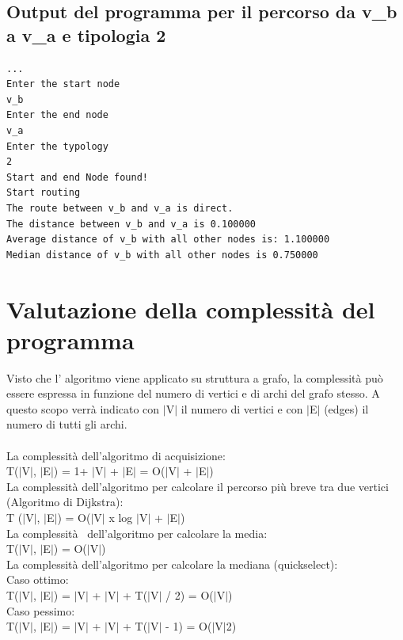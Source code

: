 \documentclass[11pt, a4paper, titlepage, block]{article}
\begin{document}
	\subsection{Output del programma per il percorso da v\_b a v\_a e tipologia 2}
	\begin{lstlisting}
...
Enter the start node
v_b
Enter the end node
v_a
Enter the typology
2
Start and end Node found!
Start routing
The route between v_b and v_a is direct.
The distance between v_b and v_a is 0.100000
Average distance of v_b with all other nodes is: 1.100000
Median distance of v_b with all other nodes is 0.750000
\end{lstlisting}
	
	\newpage
\section{Valutazione della complessit\`{a} del programma}
	Visto che l' algoritmo viene applicato su struttura a grafo, la complessit\`{a} pu\`{o} essere espressa in 
	funzione del numero di vertici e di archi del grafo stesso. A questo scopo verr\`{a} indicato con $|$V$|$ il 
	numero di vertici e con $|$E$|$ (edges) il numero di tutti gli archi.\\
	\\
	La complessit\`{a} dell'algoritmo di acquisizione:\\
	\indent T($|$V$|$, $|$E$|$) = 1+ $|$V$|$ + $|$E$|$ = O($|$V$|$ + $|$E$|$)\\
	La complessit\`{a} dell'algoritmo per calcolare il percorso pi\`{u} breve tra due vertici (Algoritmo di Dijkstra):\\
	\indent T ($|$V$|$, $|$E$|$) = O($|$V$|$ x log $|$V$|$ + $|$E$|$)\\
	La complessit\`{a}  dell'algoritmo per calcolare la media:\\
	\indent T($|$V$|$, $|$E$|$) = O($|$V$|$)\\
	La complessit\`{a} dell'algoritmo per calcolare la mediana (quickselect):\\
	\indent Caso ottimo:\\
	\indent \indent T($|$V$|$, $|$E$|$) = $|$V$|$ + $|$V$|$ + T($|$V$|$ / 2) = O($|$V$|$)\\
	\indent Caso pessimo:\\
	\indent \indent T($|$V$|$, $|$E$|$) = $|$V$|$ + $|$V$|$ + T($|$V$|$ - 1) = O($|$V$|$2)\\
	\newpage
\end{document}
